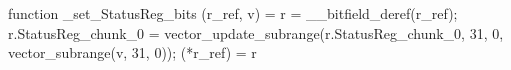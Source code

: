 function _set_StatusReg_bits (r_ref, v) = {
    r = __bitfield_deref(r_ref);
    r.StatusReg_chunk_0 = vector_update_subrange(r.StatusReg_chunk_0, 31, 0, vector_subrange(v, 31, 0));
    (*r_ref) = r
}
